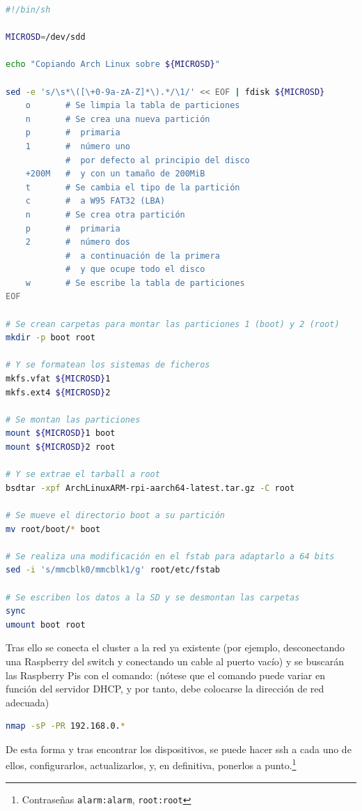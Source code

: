 \begin{lstlisting}[language=bash]
#!/bin/sh

MICROSD=/dev/sdd

echo "Copiando Arch Linux sobre ${MICROSD}"

sed -e 's/\s*\([\+0-9a-zA-Z]*\).*/\1/' << EOF | fdisk ${MICROSD}
    o       # Se limpia la tabla de particiones
    n       # Se crea una nueva partición
    p       #  primaria
    1       #  número uno
            #  por defecto al principio del disco
    +200M   #  y con un tamaño de 200MiB
    t       # Se cambia el tipo de la partición
    c       #  a W95 FAT32 (LBA)
    n       # Se crea otra partición
    p       #  primaria
    2       #  número dos
            #  a continuación de la primera
            #  y que ocupe todo el disco
    w       # Se escribe la tabla de particiones
EOF

# Se crean carpetas para montar las particiones 1 (boot) y 2 (root)
mkdir -p boot root

# Y se formatean los sistemas de ficheros
mkfs.vfat ${MICROSD}1
mkfs.ext4 ${MICROSD}2

# Se montan las particiones
mount ${MICROSD}1 boot
mount ${MICROSD}2 root

# Y se extrae el tarball a root
bsdtar -xpf ArchLinuxARM-rpi-aarch64-latest.tar.gz -C root

# Se mueve el directorio boot a su partición
mv root/boot/* boot

# Se realiza una modificación en el fstab para adaptarlo a 64 bits
sed -i 's/mmcblk0/mmcblk1/g' root/etc/fstab

# Se escriben los datos a la SD y se desmontan las carpetas
sync
umount boot root
\end{lstlisting}

Tras ello se conecta el cluster a la red ya existente (por ejemplo, desconectando una Raspberry del switch y conectando un cable al puerto vacío) y se buscarán las Raspberry Pis con el comando: (nótese que el comando puede variar en función del servidor DHCP, y por tanto, debe colocarse la dirección de red adecuada)

\begin{lstlisting}[language=bash]
nmap -sP -PR 192.168.0.*
\end{lstlisting}

De esta forma y tras encontrar los dispositivos, se puede hacer ssh a cada uno de ellos, configurarlos, actualizarlos, y, en definitiva, ponerlos a punto.\footnote{Contraseñas \texttt{alarm:alarm}, \texttt{root:root}}

